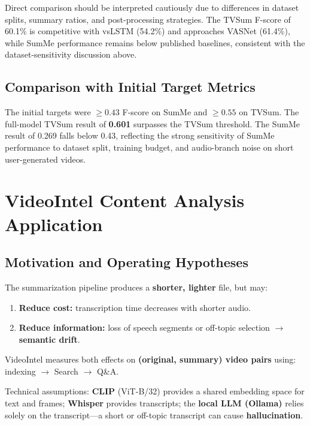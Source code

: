 \documentclass[10pt,conference]{IEEEtran}
\begin{document}
Direct comparison should be interpreted cautiously due to differences in
dataset splits, summary ratios, and post-processing strategies.
The TVSum F-score of 60.1\% is competitive with vsLSTM (54.2\%) and
approaches VASNet (61.4\%), while SumMe performance remains below
published baselines, consistent with the dataset-sensitivity discussion
above.

\subsection{Comparison with Initial Target Metrics}

The initial targets were $\ge 0.43$ F-score on SumMe and $\ge 0.55$ on
TVSum. The full-model TVSum result of \textbf{0.601} surpasses the TVSum
threshold. The SumMe result of 0.269 falls below 0.43, reflecting the
strong sensitivity of SumMe performance to dataset split, training budget,
and audio-branch noise on short user-generated videos.

\section{VideoIntel Content Analysis Application}

\subsection{Motivation and Operating Hypotheses}

The summarization pipeline produces a \textbf{shorter, lighter} file, but may:
\begin{enumerate}
  \item \textbf{Reduce cost:} transcription time decreases with shorter audio.
  \item \textbf{Reduce information:} loss of speech segments or off-topic
        selection $\to$ \textbf{semantic drift}.
\end{enumerate}
VideoIntel measures both effects on \textbf{(original, summary) video pairs}
using: indexing $\to$ Search $\to$ Q\&A.

Technical assumptions: \textbf{CLIP} (ViT-B/32) provides a shared embedding
space for text and frames; \textbf{Whisper} provides transcripts; the
\textbf{local LLM (Ollama)} relies solely on the transcript---a short or
off-topic transcript can cause \textbf{hallucination}.
\end{document}
